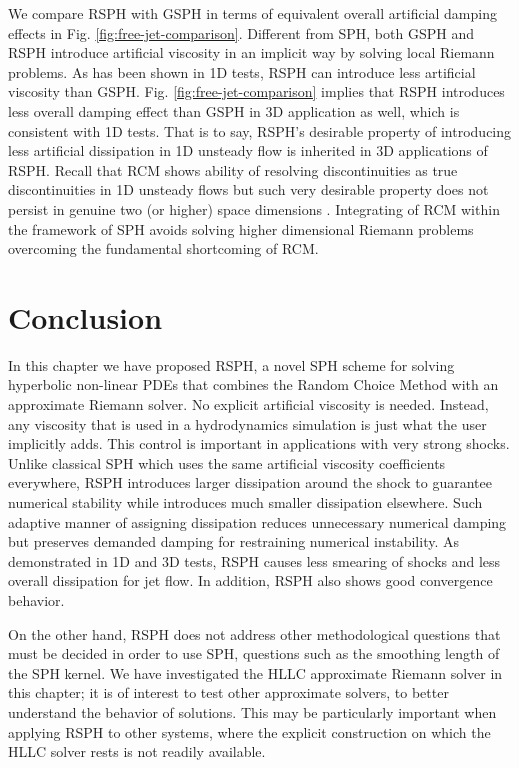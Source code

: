 We compare RSPH with GSPH in terms of equivalent overall artificial damping effects in Fig. \ref{fig:free-jet-comparison}. Different from SPH, both GSPH and RSPH introduce artificial viscosity in an implicit way by solving local Riemann problems. As has been shown in 1D tests, RSPH can introduce less artificial viscosity than GSPH. Fig. \ref{fig:free-jet-comparison} implies that RSPH introduces less overall damping effect than GSPH in 3D application as well, which is consistent with 1D tests. That is to say, RSPH's desirable property of introducing less artificial dissipation in 1D unsteady flow is inherited in 3D applications of RSPH. Recall that RCM shows ability of resolving discontinuities as true discontinuities in 1D unsteady flows but such very desirable property does not persist in genuine two (or higher) space dimensions \citep{colella1982glimm}. Integrating of RCM within the framework of SPH avoids solving higher dimensional Riemann problems overcoming the fundamental shortcoming of RCM.

\section{Conclusion} \label{discussion}
In this chapter we have proposed RSPH, a novel SPH scheme for solving hyperbolic non-linear PDEs that combines the Random Choice Method with an approximate Riemann solver. No explicit artificial viscosity is needed. Instead, any viscosity that is used in a hydrodynamics simulation is just what the user implicitly adds. 
This control is important in applications with very strong shocks. 
Unlike classical SPH which uses the same artificial viscosity coefficients everywhere, RSPH introduces larger dissipation around the shock to guarantee numerical stability while introduces much smaller dissipation elsewhere. Such adaptive manner of assigning dissipation reduces unnecessary numerical damping but preserves demanded damping for restraining numerical instability. As demonstrated in 1D and 3D tests, RSPH causes less smearing of shocks and less overall dissipation for jet flow.
In addition, RSPH also shows good convergence behavior.

On the other hand, RSPH does not address other methodological questions that must be decided in order to use SPH, questions such as the smoothing length of the SPH kernel. We have investigated the HLLC approximate Riemann solver in this chapter; it is of interest to test other approximate solvers, to better understand the behavior of solutions. This may be particularly important when applying RSPH to other systems, where the explicit construction on which the HLLC solver rests is not readily available.